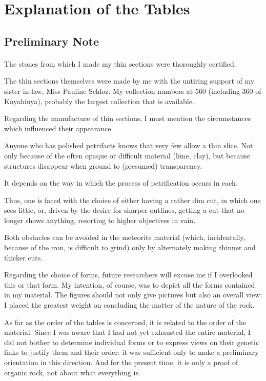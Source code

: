 \documentclass[a4paper, 11pt, oneside]{article}
\begin{document}
\section{Explanation of the Tables}
\subsection{Preliminary Note}
\paragraph{}
The stones from which I made my thin sections were thoroughly certified.

The thin sections themselves were made by me with the untiring support of my sister-in-law, Miss Pauline Schloz. My collection numbers at 560 (including 360 of Knyahinya), probably the largest collection that is available.

Regarding the manufacture of thin sections, I must mention the circumstances which influenced their appearance.

Anyone who has polished petrifacts knows that very few allow a thin slice. Not only because of the often opaque or difficult material (lime, clay), but because structures disappear when ground to (presumed) transparency.

It depends on the way in which the process of petrification occurs in each.

Thus, one is faced with the choice of either having a rather dim cut, in which one sees little, or, driven by the desire for sharper outlines, getting a cut that no longer shows anything, resorting to higher objectives in vain.

Both obstacles can be avoided in the meteorite material (which, incidentally, because of the iron, is difficult to grind) only by alternately making thinner and thicker cuts.

Regarding the choice of forms, future researchers will excuse me if I overlooked this or that form. My intention, of course, was to depict all the forms contained in my material. The figures should not only give pictures but also an overall view: I placed the greatest weight on concluding the matter of the nature of the rock.

As far as the order of the tables is concerned, it is related to the order of the material. Since I was aware that I had not yet exhausted the entire material, I did not bother to determine individual forms or to express views on their genetic links to justify them and their order: it was sufficient only to make a preliminary orientation in this direction. And for the present time, it is only a proof of organic rock, not about what everything is.
\end{document}
